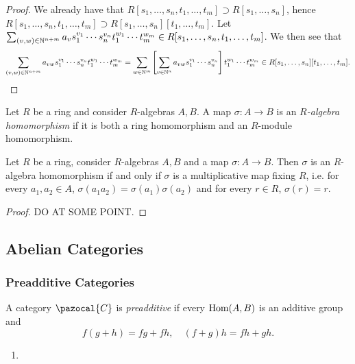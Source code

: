 \begin{proof}
    We already have that $R[s_1,\dots,s_n,t_1,\dots,t_m]\supset R[s_1,\dots,s_n]$, hence $R[s_1,\dots,s_n,t_1,\dots,t_m]\supset R[s_1,\dots,s_n][t_1,\dots,t_m]$. Let $\sum_{(v,w)\in\mathbb{N}^{n+m}} a_vs_1^{v_1}\cdots s_n^{v_n}t_1^{w_1}\cdots t_m^{w_m}\in R[s_1,\dots,s_n,t_1,\dots,t_m]$. We then see that 
    $$\sum_{(v,w)\in\mathbb{N}^{n+m}} a_{vw}s_1^{v_1}\cdots s_n^{v_n}t_1^{w_1}\cdots t_m^{w_m} = \sum_{w\in \mathbb{N}^m}\left[\sum_{v\in \mathbb{N}^n} a_{vw}s_1^{v_1}\cdots s_n^{v_n}\right] t_1^{w_1}\cdots t_m^{w_m}\in R[s_1,\dots,s_n][t_1,\dots,t_m].$$
\end{proof}
\begin{definition}
    Let $R$ be a ring and consider $R$-algebras $A,B$. A map $\sigma : A\rightarrow B$ is an \textit{$R$-algebra homomorphism} if it is both a ring homomorphism and an $R$-module homomorphism.
\end{definition}
\begin{lemma}
    Let $R$ be a ring, consider $R$-algebras $A,B$ and a map $\sigma : A\rightarrow B$. Then $\sigma$ is an $R$-algebra homomorphism if and only if $\sigma$ is a multiplicative map fixing $R$, i.e. for every $a_1,a_2\in A$, $\sigma(a_1a_2)=\sigma(a_1)\sigma(a_2)$ and for every $r\in R$, $\sigma(r) = r$.
\end{lemma}
\begin{proof}
    {\Large DO AT SOME POINT}.
\end{proof}
\subsection{Abelian Categories}
\subsubsection{Preadditive Categories}
\begin{definition}
    A category $\pazocal{C}$ is \textit{preadditive} if every $\mathrm{Hom}(A,B)$ is an additive group and 
    $$f(g+h)=fg+fh, \quad (f+g)h=fh+gh.$$
\end{definition}
\begin{example}
    \begin{enumerate}
        \item 
    \end{enumerate}
\end{example}
